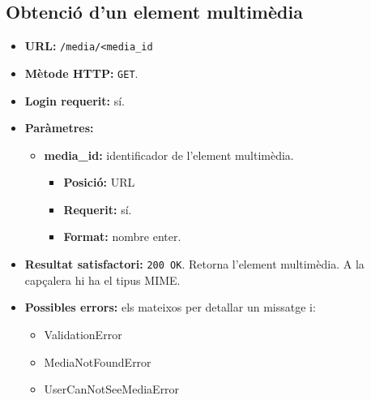 \subsection{Obtenció d'un element multimèdia}
\begin{itemize}
\item \textbf{\ac{URL}:} \texttt{/media/<media\_id}
\item \textbf{Mètode \ac{HTTP}: } \texttt{GET}.
\item \textbf{Login requerit:} sí.
\item \textbf{Paràmetres:}
	\begin{itemize}
		\item \textbf{media\_id:} identificador de l'element multimèdia.
		\begin{itemize}
			\item \textbf{Posició:} \ac{URL}
			\item \textbf{Requerit:} sí.
			\item \textbf{Format:} nombre enter.
		\end{itemize}
	\end{itemize}
	\item \textbf{Resultat satisfactori:} \texttt{200 OK}. Retorna l'element multimèdia. A la capçalera hi ha el tipus MIME.
	
	\item \textbf{Possibles errors:} els mateixos per detallar un missatge i:
	\begin{itemize}
		\item ValidationError
		\item MediaNotFoundError
		\item UserCanNotSeeMediaError
	\end{itemize}
\end{itemize}

